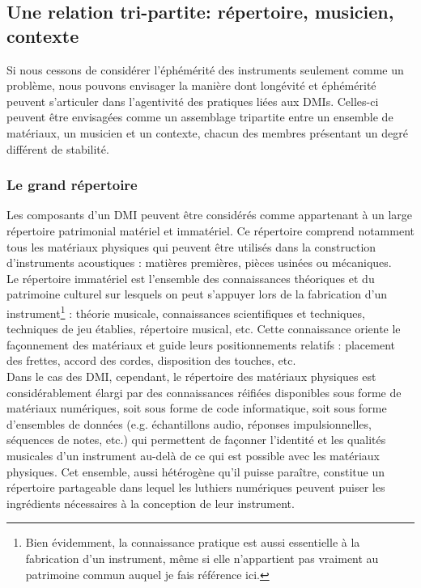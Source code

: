 \subsection{Une relation tri-partite: répertoire, musicien, contexte}

\noindent Si nous cessons de considérer l'éphémérité des instruments seulement comme un problème, nous pouvons envisager la manière dont longévité et éphémérité peuvent s'articuler dans l'agentivité des pratiques liées aux \glspl{DMI}. Celles-ci peuvent être envisagées comme un assemblage tripartite entre un ensemble de matériaux, un musicien et un contexte, chacun des membres présentant un degré différent de stabilité.

\subsubsection{Le grand répertoire}

\noindent Les composants d'un \gls{DMI} peuvent être considérés comme appartenant à un large répertoire patrimonial matériel et immatériel. Ce répertoire comprend notamment tous les matériaux physiques qui peuvent être utilisés dans la construction d'instruments acoustiques : matières premières, pièces usinées ou mécaniques. \\
\indent Le répertoire immatériel est l'ensemble des connaissances théoriques et du patrimoine culturel sur lesquels on peut s'appuyer lors de la fabrication d'un instrument\footnote{Bien évidemment, la connaissance pratique est aussi essentielle à la fabrication d'un instrument, même si elle n'appartient pas vraiment au patrimoine commun auquel je fais référence ici.} : théorie musicale, connaissances scientifiques et techniques, techniques de jeu établies, répertoire musical, etc. Cette connaissance oriente le façonnement des matériaux et guide leurs positionnements relatifs :  placement des frettes, accord des cordes, disposition des touches, etc.\\
\indent Dans le cas des \gls{DMI}, cependant, le répertoire des matériaux physiques est considérablement élargi par des connaissances réifiées disponibles sous forme de matériaux numériques, soit sous forme de code informatique, soit sous forme d'ensembles de données (e.g. échantillons audio, réponses impulsionnelles, séquences de notes, etc.) qui permettent de façonner l'identité et les qualités musicales d'un instrument au-delà de ce qui est possible avec les matériaux physiques. Cet ensemble, aussi hétérogène qu'il puisse paraître, constitue un répertoire partageable dans lequel les luthiers numériques peuvent puiser les ingrédients nécessaires à la conception de leur instrument.

